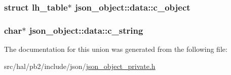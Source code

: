 \subsubsection[{\texorpdfstring{c\+\_\+object}{c_object}}]{\setlength{\rightskip}{0pt plus 5cm}struct {\bf lh\+\_\+table}$\ast$ json\+\_\+object\+::data\+::c\+\_\+object}\hypertarget{unionjson__object_1_1data_a68089c942f154d4df590d8ecb476a69b}{}\label{unionjson__object_1_1data_a68089c942f154d4df590d8ecb476a69b}
\subsubsection[{\texorpdfstring{c\+\_\+string}{c_string}}]{\setlength{\rightskip}{0pt plus 5cm}char$\ast$ json\+\_\+object\+::data\+::c\+\_\+string}\hypertarget{unionjson__object_1_1data_a2749f46b4691f85695cecb9f4e365321}{}\label{unionjson__object_1_1data_a2749f46b4691f85695cecb9f4e365321}


The documentation for this union was generated from the following file\+:\begin{DoxyCompactItemize}
\item 
src/hal/pb2/include/json/\hyperlink{json__object__private_8h}{json\+\_\+object\+\_\+private.\+h}\end{DoxyCompactItemize}
